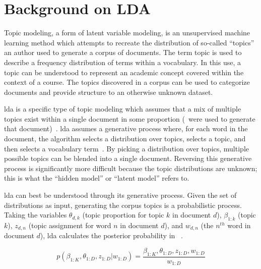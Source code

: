 \section{Background on LDA}
\label{sec:background}


Topic modeling, a form of latent variable modeling, is an unsupervised machine learning method which attempts to recreate the distribution of so-called ``topics'' an author used to generate a corpus of documents.
The term topic is used to describe a frequency distribution of terms within a vocabulary.
In this use, a topic can be understood to represent an academic concept covered within the context of a course.
The topics discovered in a corpus can be used to categorize documents and provide structure to an otherwise unknown dataset.


\acf{lda} is a specific type of topic modeling which assumes that a mix of multiple topics exist within a single document in some proportion (\ie\ were used to generate that document)~\cite{Blei2003}.
\ac{lda} assumes a generative process where, for each word in the document, the algorithm selects a distribution over topics, selects a topic, and then selects a vocabulary term~\cite{Blei2003}.
By picking a distribution over topics, multiple possible topics can be blended into a single document.
Reversing this generative process is significantly more difficult because the topic distributions are unknown; this is what the ``hidden model'' or ``latent model'' refers to.


\ac{lda} can best be understood through its generative process.
Given the set of distributions as input, generating the corpus topics is a probabilistic process.
Taking the variables $\theta_{d,k}$ (topic proportion for topic $k$ in document $d$), $\beta_{1:k}$ (topic $k$), $z_{d,n}$ (topic assignment for word $n$ in document $d$), and $w_{d,n}$ (the $n^{th}$ word in document $d$), \ac{lda} calculates the posterior probability in ~\cite{Blei2012}.


\begin{equation}
p(\beta_{1:K}, \theta_{1:D},z_{1:D} | w_{1:D}) = \frac{\beta_{1:K},
\theta_{1:D},z_{1:D}, w_{1:D}}{w_{1:D}}
\label{eq:posterior}
\end{equation}

